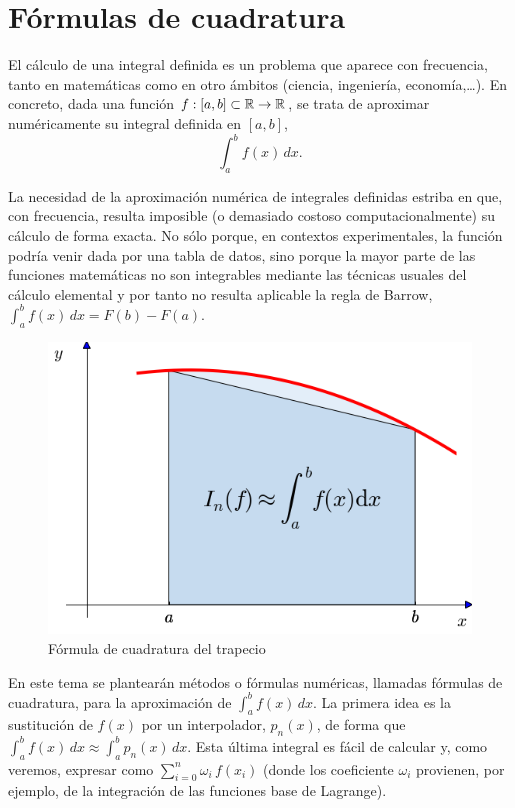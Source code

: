 \newcommand{\ox}{\overline x}

\section{Fórmulas de cuadratura}
\label{sect:form-de-cuadratura}



El cálculo de una integral definida es un problema que aparece con
frecuencia, tanto en matemáticas como en otro ámbitos (ciencia,
ingeniería, economía,\dots). En concreto, dada una función
$f:[a,b]\subset\operatorname{{\mathbb R}}\to\operatorname{{\mathbb R}}$, se trata de aproximar numéricamente su
integral definida en $[a,b]$,
\begin{equation*}
  \int_a^bf(x)\,dx.
\end{equation*}

La necesidad de la aproximación numérica de integrales definidas
estriba en que, con frecuencia, resulta imposible (o demasiado costoso
computacionalmente) su cálculo de forma exacta. No sólo porque, en
contextos experimentales, la función podría venir dada por una tabla
de datos, sino porque la mayor parte de las funciones matemáticas no
son integrables mediante las técnicas usuales del cálculo elemental
y por tanto no resulta aplicable la regla de Barrow, $\int_a^b f(x)\,
dx=F(b)-F(a)$.

\begin{figure}
  \centering
    \includegraphics[width=0.5\linewidth]{tema3/fc-trapecio}
  \caption{Fórmula de cuadratura del trapecio}
  \label{fig:fc-trapecio}
\end{figure}
En este tema se plantearán métodos o fórmulas numéricas, llamadas
fórmulas de cuadratura, para la aproximación de $\int_a^b f(x)\,
dx$. La primera idea es la sustitución de $f(x)$ por un interpolador,
$p_n(x)$, de forma que $\int_a^bf(x)\,dx \approx \int_a^b p_n(x)\,
dx$. Esta última integral es fácil de calcular y, como veremos,
expresar como $\sum_{i=0}^n \omega_i \, f(x_i)$ (donde los coeficiente
$\omega_i$ provienen, por ejemplo, de la integración de las
funciones base de Lagrange).


